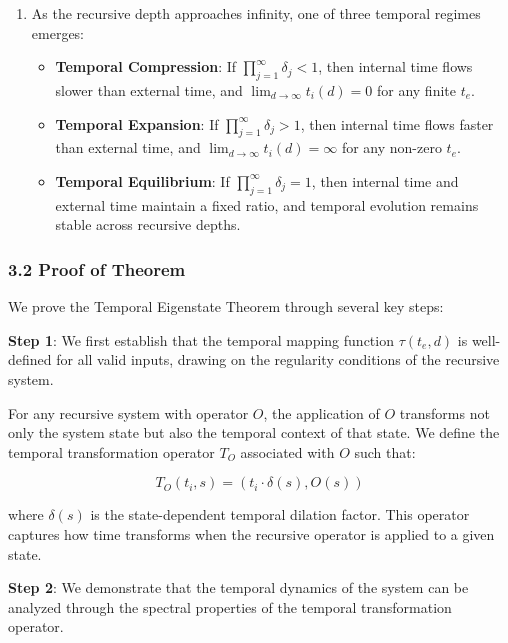 \documentclass[
]{article}
\providecommand{\tightlist}{%
  \setlength{\itemsep}{0pt}\setlength{\parskip}{0pt}}
\begin{document}
\begin{enumerate}
\def\labelenumi{\arabic{enumi}.}
\setcounter{enumi}{3}
\tightlist
\item
  As the recursive depth approaches infinity, one of three temporal
  regimes emerges:

  \begin{itemize}
  \tightlist
  \item
    \textbf{Temporal Compression}: If
    \(\prod_{j=1}^{\infty} \delta_j < 1\), then internal time flows
    slower than external time, and \(\lim_{d \to \infty} t_i(d) = 0\)
    for any finite \(t_e\).
  \item
    \textbf{Temporal Expansion}: If
    \(\prod_{j=1}^{\infty} \delta_j > 1\), then internal time flows
    faster than external time, and
    \(\lim_{d \to \infty} t_i(d) = \infty\) for any non-zero \(t_e\).
  \item
    \textbf{Temporal Equilibrium}: If
    \(\prod_{j=1}^{\infty} \delta_j = 1\), then internal time and
    external time maintain a fixed ratio, and temporal evolution remains
    stable across recursive depths.
  \end{itemize}
\end{enumerate}

\subsubsection{3.2 Proof of Theorem}\label{proof-of-theorem}

We prove the Temporal Eigenstate Theorem through several key steps:

\textbf{Step 1}: We first establish that the temporal mapping function
\(\tau(t_e, d)\) is well-defined for all valid inputs, drawing on the
regularity conditions of the recursive system.

For any recursive system with operator \(O\), the application of \(O\)
transforms not only the system state but also the temporal context of
that state. We define the temporal transformation operator \(T_O\)
associated with \(O\) such that:

\[T_O(t_i, s) = (t_i \cdot \delta(s), O(s))\]

where \(\delta(s)\) is the state-dependent temporal dilation factor.
This operator captures how time transforms when the recursive operator
is applied to a given state.

\textbf{Step 2}: We demonstrate that the temporal dynamics of the system
can be analyzed through the spectral properties of the temporal
transformation operator.
\end{document}
